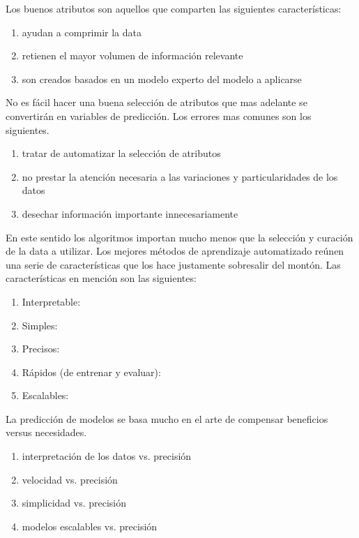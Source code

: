 \documentclass[letterpaper, spanish, 11pt]{report}
\begin{document}
Los buenos atributos son aquellos que comparten las siguientes características:

\begin{enumerate}
	\item ayudan a comprimir la data
	\item retienen el mayor volumen de información relevante
	\item son creados basados en un modelo experto del modelo a aplicarse
\end{enumerate}

No es fácil hacer una buena selección de atributos que mas adelante se convertirán en variables de predicción. Los errores mas comunes son los siguientes. 

\begin{enumerate}
	\item tratar de automatizar la selección de atributos
	\item no prestar la atención necesaria a las variaciones y particularidades de los datos
	\item desechar información importante innecesariamente
\end{enumerate}

En este sentido los algoritmos importan mucho menos que la selección y curación de la data a utilizar. Los mejores métodos de aprendizaje automatizado reúnen una serie de características que los hace justamente sobresalir del montón. Las características en mención son las siguientes:

\begin{enumerate}
	\item Interpretable: 
	\item Simples:
	\item Precisos:
	\item Rápidos (de entrenar y evaluar):
	\item Escalables: 
\end{enumerate}

La predicción de modelos se basa mucho en el arte de compensar beneficios versus necesidades.

\begin{enumerate}
	\item interpretación de los datos vs. precisión
	\item velocidad vs. precisión
	\item simplicidad vs. precisión
	\item modelos escalables vs. precisión 
\end{enumerate}
\end{document}
